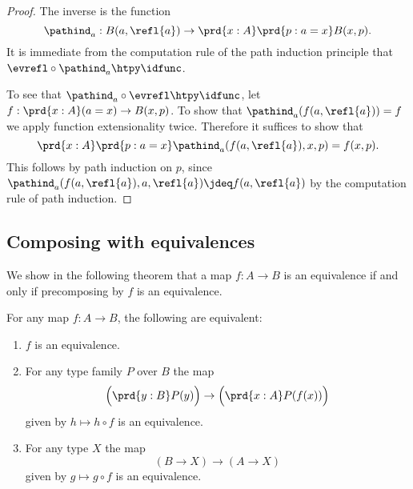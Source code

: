 \begin{proof}
  The inverse is the function
  \begin{equation*}
    \pathind_a : B(a,\refl{a})\to \prd{x:A}\prd{p:a=x}B(x,p).
  \end{equation*}
  It is immediate from the computation rule of the path induction principle that $\evrefl\circ\pathind_a\htpy \idfunc$.

To see that $\pathind_a\circ \evrefl\htpy\idfunc$, let $f:\prd{x:A}(a=x)\to B(x,p)$. To show that $\pathind_a(f(a,\refl{a}))=f$ we apply function extensionality twice. Therefore it suffices to show that
\begin{equation*}
\prd{x:A}\prd{p:a=x} \pathind_a(f(a,\refl{a}),x,p)=f(x,p).
\end{equation*}
This follows by path induction on $p$, since $\pathind_a(f(a,\refl{a}),a,\refl{a})\jdeq f(a,\refl{a})$ by the computation rule of path induction.
\end{proof}

\subsection{Composing with equivalences}

We show in the following theorem that a map $f:A\to B$ is an equivalence if and only if precomposing by $f$ is an equivalence.

\begin{thm}\label{ex:equiv_precomp}
  For any map $f:A\to B$, the following are equivalent:
  \begin{enumerate}
  \item $f$ is an equivalence.
  \item For any type family $P$ over $B$ the map
    \begin{equation*}
      \Big(\prd{y:B}P(y)\Big)\to\Big(\prd{x:A}P(f(x))\Big)
    \end{equation*}
    given by $h\mapsto h\circ f$ is an equivalence.
  \item For any type $X$ the map
    \begin{equation*}
      (B\to X)\to (A\to X)
    \end{equation*}
    given by $g\mapsto g\circ f$ is an equivalence. 
  \end{enumerate}
\end{thm}

